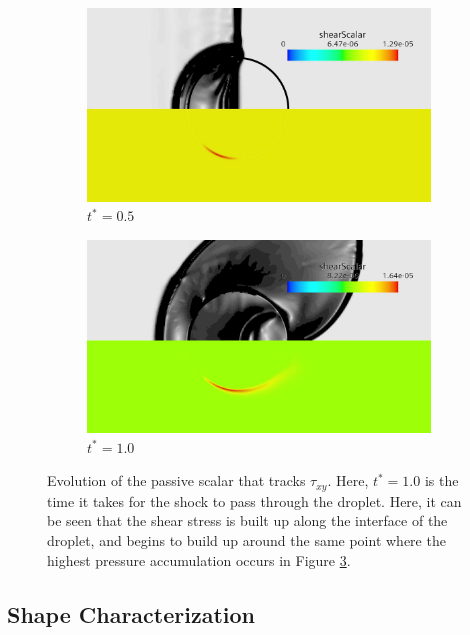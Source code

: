 \documentclass{UCF_ETD}
\begin{document}
\begin{figure}[htp!]
    \centering
    \begin{subfigure}{0.4\textwidth}
        \includegraphics[width=\textwidth]{Figures/shearScalarMiddle.jpg}
        \caption{$t^{*} = 0.5$}
        \label{fig:t_star_0.5_shear}
    \end{subfigure}
    \begin{subfigure}{0.4\textwidth}
        \includegraphics[width=\textwidth]{Figures/shearScalarFinal.jpg}
        \caption{$t^{*} = 1.0$}
        \label{fig:t_star_1_shear}
    \end{subfigure}
    \caption{Evolution of the passive scalar that tracks $\tau_{xy}$. Here, $t^{*} = 1.0$ is the time it takes for the shock to pass through the droplet. Here, it can be seen that the shear stress is built up along the interface of the droplet, and begins to build up around the same point where the highest pressure accumulation occurs in Figure \ref{fig:pressureGradScalar}.}
    \label{fig:pressureGradScalar}
\end{figure}

\subsection{Shape Characterization}
\label{subsec:shapeCharacterResults}
\end{document}
